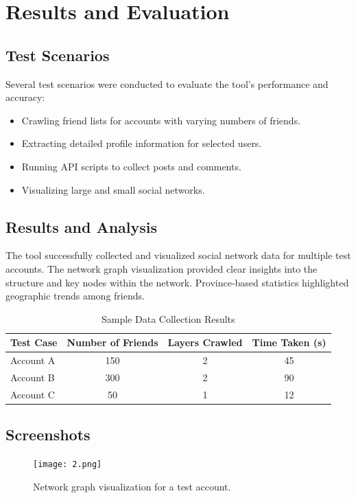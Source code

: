 \documentclass[13pt,a4paper]{report}
\begin{document}
\chapter{Results and Evaluation}
\section{Test Scenarios}
Several test scenarios were conducted to evaluate the tool's performance and accuracy:
\begin{itemize}
    \item Crawling friend lists for accounts with varying numbers of friends.
    \item Extracting detailed profile information for selected users.
    \item Running API scripts to collect posts and comments.
    \item Visualizing large and small social networks.
\end{itemize}

\section{Results and Analysis}
The tool successfully collected and visualized social network data for multiple test accounts. The network graph visualization provided clear insights into the structure and key nodes within the network. Province-based statistics highlighted geographic trends among friends.

\begin{table}[h!]
    \centering
    \caption{Sample Data Collection Results}
    \begin{tabular}{@{}lccc@{}}
        \toprule
        Test Case & Number of Friends & Layers Crawled & Time Taken (s) \\
        \midrule
        Account A & 150 & 2 & 45 \\
        Account B & 300 & 2 & 90 \\
        Account C & 50 & 1 & 12 \\
        \bottomrule
    \end{tabular}
\end{table}

\section{Screenshots}
\begin{figure}[h!]
    \centering
    \texttt{[image: 2.png]}
    \caption{Network graph visualization for a test account.}
\end{figure}
\end{document}
